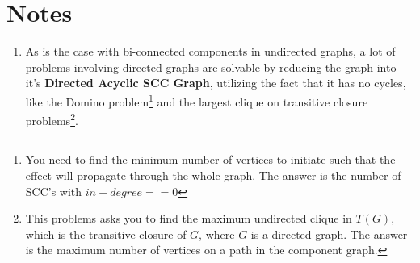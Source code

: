 \documentclass[12pt]{book}
\begin{document}
\section{Notes}
\begin{enumerate}[label = \roman*.]
\item As is the case with bi-connected components in undirected graphs, a lot of problems involving directed graphs are solvable by reducing the graph into it's \textbf{Directed Acyclic SCC Graph}, utilizing the fact that it has no cycles, like the Domino problem\footnote{You need to find the minimum number of vertices to initiate such that the effect will propagate through the whole graph. The answer is the number of SCC's with $in-degree == 0$} and the largest clique on transitive closure problems\footnote{This problems asks you to find the maximum undirected clique in $T(G)$, which is the transitive closure of $G$, where $G$ is a directed graph. The answer is the maximum number of vertices on a path in the component graph.}.
\end{enumerate}
\end{document}
